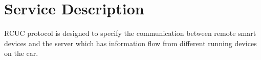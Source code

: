 \section{Service Description}
\label{sec:serv_desc}
\textsf{RCUC} protocol is designed to specify the communication between remote smart devices and the server which has information flow from different running devices on the car. 